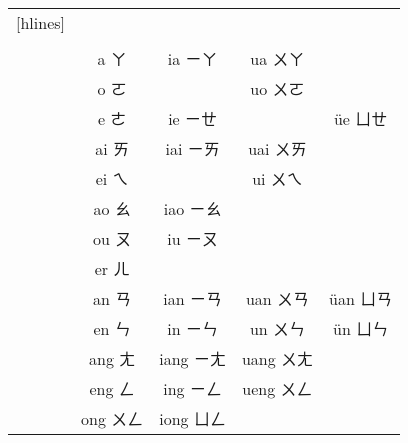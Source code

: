 \newpage
\begin{table}[H]
    \centering
    \caption{}
    \label{table:韻母表}
    \vspace{.5em}
    \begin{NiceTabular}{>{}c*{4}{c}}[hlines]
        \toprule
         &  &  &  &  \\
        &  &  &  &  \\\midrule[.6pt]
         & a ㄚ & ia ㄧㄚ & ua ㄨㄚ & \\
        & o ㄛ & & uo ㄨㄛ & \\
        & e ㄜ & ie ㄧㄝ & & \"ue ㄩㄝ \\\midrule[.6pt]
         & ai ㄞ & iai ㄧㄞ & uai ㄨㄞ & \\
        & ei ㄟ & & ui ㄨㄟ & \\
        & ao ㄠ & iao ㄧㄠ & & \\
        & ou ㄡ & iu ㄧㄡ & & \\
        & er ㄦ & & & \\\midrule[.6pt]
         & an ㄢ & ian ㄧㄢ & uan ㄨㄢ & \"uan ㄩㄢ \\
        & en ㄣ & in ㄧㄣ & un ㄨㄣ & \"un ㄩㄣ \\
        & ang ㄤ & iang ㄧㄤ & uang ㄨㄤ & \\
        & eng ㄥ & ing ㄧㄥ & ueng ㄨㄥ & \\
        & ong ㄨㄥ & iong ㄩㄥ & & \\\bottomrule
    \end{NiceTabular}
\end{table}
